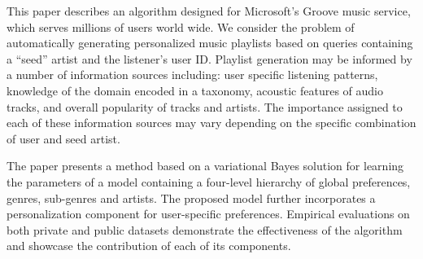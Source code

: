 This paper describes an algorithm designed for Microsoft's Groove music service, which serves millions of users world wide.  We consider the problem of automatically generating personalized music playlists based on queries containing a ``seed'' artist and the listener's user ID. 
Playlist generation may be informed by a number of information sources including: user specific listening patterns, knowledge of the domain encoded in a taxonomy, acoustic features of audio tracks, and overall popularity of tracks and artists. The importance assigned to each of these information sources may vary depending on the specific combination of user and seed artist.

The paper presents a method based on a variational Bayes solution for learning the parameters of a model containing a four-level hierarchy of global preferences, genres, sub-genres and artists. The proposed model further incorporates a personalization component for user-specific preferences.
Empirical evaluations on both private and public datasets demonstrate the effectiveness of the algorithm and showcase the contribution of each of its components.

 
